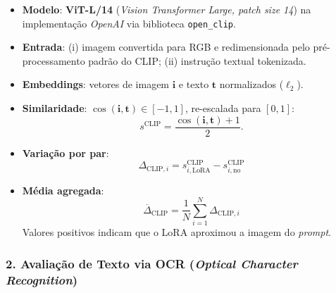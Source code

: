 \documentclass[12pt, %
openright, 
oneside, %
a4paper,    %
brazil]{facom-ufu-abntex2}
\begin{document}
\begin{itemize}
  \item \textbf{Modelo}: \textbf{ViT-L/14} (\emph{Vision Transformer Large, patch size 14}) na implementação \textit{OpenAI} via biblioteca \texttt{open\_clip}.
  \item \textbf{Entrada}: (i) imagem convertida para RGB e redimensionada pelo pré-processamento padrão do CLIP; (ii) instrução textual tokenizada.
  \item \textbf{Embeddings}: vetores de imagem $\mathbf{i}$ e texto $\mathbf{t}$ normalizados ($\ell_2$).
  \item \textbf{Similaridade}: $\cos(\mathbf{i},\mathbf{t})\in[-1,1]$,
        re-escalada para $[0,1]$:
        \[
          s^{\text{CLIP}} = \frac{\cos(\mathbf{i},\mathbf{t})+1}{2}.
        \]
  \item \textbf{Variação por par}:  
        \[
          \boxed{\,
            \Delta_{\text{CLIP},i} =
            s^{\text{CLIP}}_{i,\text{LoRA}} -
            s^{\text{CLIP}}_{i,\text{no}}
          \,}
        \]
  \item \textbf{Média agregada}:  
        \[
          \boxed{\,
            \overline{\Delta}_{\text{CLIP}} =
            \frac{1}{N}
            \sum_{i=1}^{N}
            \Delta_{\text{CLIP},i}
          \,}
        \]
        Valores positivos indicam que o LoRA aproximou a imagem do \textit{prompt}.
\end{itemize}

\subsubsection*{2. Avaliação de Texto via OCR (\emph{Optical Character Recognition})}
\end{document}
